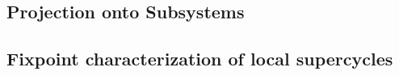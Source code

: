 
   \label{s:local.preamble}
   

   \subsection{Projection onto Subsystems}
   \label{s:projection}
   


   \subsection{Fixpoint characterization of local supercycles}
   \label{s:local.fixpoint}
   


